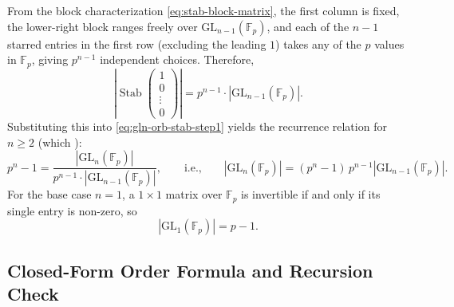 \begin{content}
From the block characterization \eqref{eq:stab-block-matrix}, the first column is fixed, the lower-right block ranges freely over $\mathrm{GL}_{n-1}(\mathbb{F}_p)$, and each of the $n - 1$ starred entries in the first row (excluding the leading $1$) takes any of the $p$ values in $\mathbb{F}_p$, giving $p^{n-1}$ independent choices. Therefore,
\[
\left|\operatorname{Stab}\begin{pmatrix} 1 \\ 0 \\ \vdots \\ 0 \end{pmatrix}\right| = p^{n-1} \cdot \left|\mathrm{GL}_{n-1}(\mathbb{F}_p)\right|.
\]
Substituting this into \eqref{eq:gln-orb-stab-step1} yields the recurrence relation for $n \ge 2$ (which ):
\begin{equation}\label{eq:gln-recursion}
p^n - 1 = \frac{\left|\mathrm{GL}_n(\mathbb{F}_p)\right|}{p^{n-1} \cdot \left|\mathrm{GL}_{n-1}(\mathbb{F}_p)\right|}, \qquad \text{i.e.,} \qquad \left|\mathrm{GL}_n(\mathbb{F}_p)\right| = (p^n - 1)\, p^{n-1} \left|\mathrm{GL}_{n-1}(\mathbb{F}_p)\right|.
\end{equation}
For the base case $n = 1$, a $1 \times 1$ matrix over $\mathbb{F}_p$ is invertible if and only if its single entry is non-zero, so
\begin{equation}\label{eq:gl1-base-case}
\left|\mathrm{GL}_1(\mathbb{F}_p)\right| = p - 1.
\end{equation}
\end{content}

\begin{hidden}
\end{hidden}

\subsection{Closed-Form Order Formula and Recursion Check}

